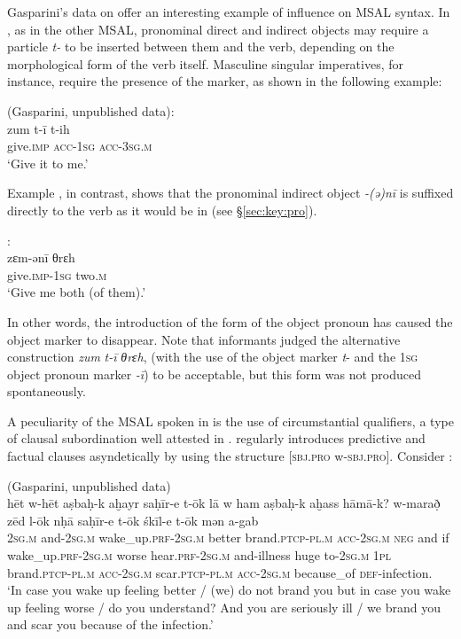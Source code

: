 \documentclass[output=paper]{langsci/langscibook}
\begin{document}
Gasparini’s data on  offer an interesting example of  influence on MSAL syntax. In , as in the other MSAL, pronominal direct and indirect objects may require a particle \textit{t-} to be inserted between them and the verb, depending on the morphological form of the verb itself. Masculine singular imperatives, for instance, require the presence of the marker, as shown in the following example:

\ea	
{ (Gasparini, unpublished data):}\\
\gll zum t-ī t-ih\\
     give.\textsc{imp} \textsc{acc-1sg} \textsc{acc-3sg.m} \\
\glt `Give it to me.'
\z

Example , in contrast, shows that the pronominal indirect object \textit{-(ə)nī} is suffixed directly to the verb as it would be in  (see §\ref{sec:key:pro}).

\ea\label{ex:key:ani}
{ \citep[66]{Gasparini2018}:}\\
\gll zɛm-ənī θrɛh\\
     give.\textsc{imp}-\textsc{1sg} two\textsc{.m}\\
\glt `Give me both (of them).'
\z

 In other words, the introduction of the  form of the object pronoun has caused the  object marker to disappear. Note that informants judged the alternative construction \textit{zum} \textit{t-ī} \textit{θrɛh}, (with the use of the object marker \textit{t}- and the 1\textsc{sg} object pronoun marker \textit{-ī}) to be acceptable, but this form was not produced spontaneously.

A peculiarity of the MSAL spoken in  is the use of circumstantial qualifiers, a type of clausal subordination well attested in   \citep{Persson2009}.  regularly introduces predictive and factual  clauses asyndetically by using the structure [\textsc{sbj.pro} w-\textsc{sbj.pro}]. Consider :

\ea\label{ex:key:het}
{ (Gasparini, unpublished data)}\\
\gll hēt w-hēt aṣbaḥ-k aḫayr saḥīr-e t-ōk lā w ham aṣbaḥ-k aḫass hāmā-k? w-marað̣ zēd l-ōk nḥā saḥīr-e t-ōk śkīl-e t-ōk mən a-gab\\
     \textsc{2sg.m} and-\textsc{2sg.m} wake\_up\textsc{.prf}-\textsc{2sg.m} better brand.\textsc{ptcp-pl.m} \textsc{acc-2sg.m} \textsc{neg} and if wake\_up.\textsc{prf-2sg.m} worse hear.\textsc{prf-2sg.m} and-illness huge to-\textsc{2sg.m} \textsc{1pl} brand.\textsc{ptcp-pl.m} \textsc{acc-2sg.m} scar.\textsc{ptcp-pl.m} \textsc{acc-2sg.m} because\_of \textsc{def}-infection.\\
\glt `In case you wake up feeling better / (we) do not brand you but in case you wake up feeling worse / do you understand? And you are seriously ill / we brand you and scar you because of the infection.'
\z
\end{document}
